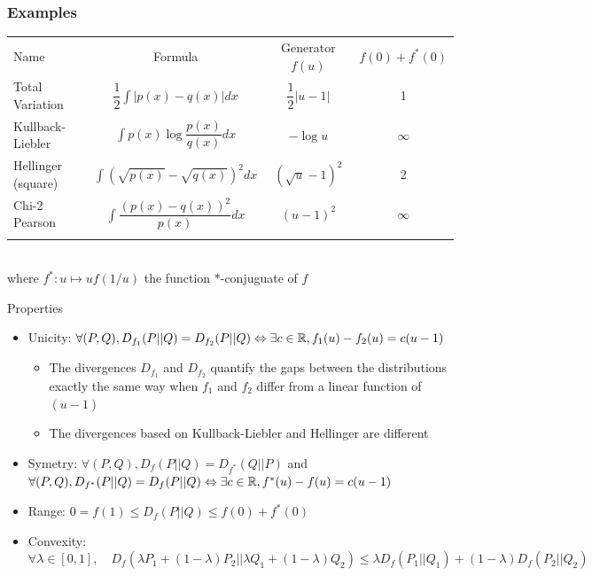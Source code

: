 \documentclass[8pt]{beamer}
\begin{document}
\begin{frame}
  \frametitle{Examples}
\small
\centering
      \begin{tabular}{lccc}
        \hline\noalign{\smallskip}
        Name & Formula & Generator $f(u)$ & $f(0)+f^*(0)$ \\
        \noalign{\smallskip}\hline\noalign{\smallskip}
        Total Variation & $\displaystyle\dfrac{1}{2}\int|p(x)-q(x)|dx$ & $\displaystyle\dfrac{1}{2}|u-1|$ & 1 \\
        Kullback-Liebler & $\displaystyle\int p(x)\log\dfrac{p(x)}{q(x)}dx$ & $\displaystyle-\log u$ & $\infty$ \\
        Hellinger (square) & $\displaystyle\int\left(\sqrt{p(x)}-\sqrt{q(x)}\right)^2dx$ & $\displaystyle\left(\sqrt{u}-1\right)^2$ & 2 \\
        Chi-2 Pearson & $\displaystyle\int\dfrac{\left(p(x)-q(x)\right)^2}{p(x)}dx$ & $\displaystyle(u-1)^2$ & $\infty$ \\
        \noalign{\smallskip}\hline \\[0.5em]
      \end{tabular}
 \\
 where $f^*:u\mapsto uf(1/u)$ the function $*$-conjuguate of $f$
\begin{block}{Properties}
  \begin{itemize}
  \item Unicity: $\forall (P,Q), D_{f_1}(P||Q)=D_{f_2}(P||Q) \Leftrightarrow \exists c\in{\mathbb R}, f_1(u)-f_2(u)=c(u-1)$ 
  \begin{itemize}
  \item The divergences $D_{f_1}$ and $D_{f_2}$  quantify the gaps between the distributions  exactly the same way when  $f_1$ and $f_2$ differ from a linear function of $(u-1)$
  \item The divergences based on Kullback-Liebler and Hellinger are different
  \end{itemize}
  \item Symetry: $\forall (P,Q), D_{f}(P||Q)=D_{f^*}(Q||P)$ and $\forall (P,Q),D_{f^*}(P||Q)=D_{f}(P||Q)\Leftrightarrow \exists c\in{\mathbb R}, f^*(u)-f(u)=c(u-1)$
  \item Range: \alert{$\displaystyle 0=f(1)\leq D_f(P||Q)\leq f(0)+f^*(0)$}
  \item Convexity: $\displaystyle \forall \lambda\in[0,1],\quad D_f(\lambda P_1+(1-\lambda)P_2||\lambda Q_1+(1-\lambda)Q_2)\leq\lambda D_f(P_1||Q_1)+(1-\lambda)D_f(P_2||Q_2)$
  \end{itemize}
  \end{block}

  \end{frame}
\end{document}
